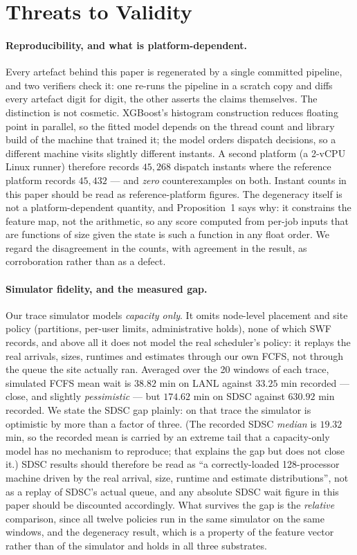 \documentclass[11pt,twocolumn]{article}
\begin{document}
\section{Threats to Validity}
\label{sec:threats}

\paragraph{Reproducibility, and what is platform-dependent.}
Every artefact behind this paper is regenerated by a single committed pipeline,
and two verifiers check it: one re-runs the pipeline in a scratch copy and diffs
every artefact digit for digit, the other asserts the claims themselves. The
distinction is not cosmetic. XGBoost's histogram construction reduces floating
point in parallel, so the fitted model depends on the thread count and library
build of the machine that trained it; the model orders dispatch decisions, so a
different machine visits slightly different instants. A second platform (a
2-vCPU Linux runner) therefore records $45{,}268$ dispatch instants where the
reference platform records $45{,}432$ --- and \emph{zero} counterexamples on
both. Instant counts in this paper should be read as reference-platform figures.
The degeneracy itself is not a platform-dependent quantity, and Proposition~1
says why: it constrains the feature map, not the arithmetic, so any score
computed from per-job inputs that are functions of size given the state is such
a function in any float order. We regard the disagreement in the counts, with
agreement in the result, as corroboration rather than as a defect.

\paragraph{Simulator fidelity, and the measured gap.}
Our trace simulator models \emph{capacity only}. It omits node-level placement
and site policy (partitions, per-user limits, administrative holds), none of
which SWF records, and above all it does not model the real scheduler's policy:
it replays the real arrivals, sizes, runtimes and estimates through our own
FCFS, not through the queue the site actually ran. Averaged over the 20 windows
of each trace, simulated FCFS mean wait is $38.82$ min on LANL against $33.25$
min recorded --- close, and slightly \emph{pessimistic} --- but $174.62$ min on
SDSC against $630.92$ min recorded. We state the SDSC gap plainly: on that trace
the simulator is optimistic by more than a factor of three. (The recorded SDSC
\emph{median} is $19.32$ min, so the recorded mean is carried by an extreme tail
that a capacity-only model has no mechanism to reproduce; that explains the gap
but does not close it.) SDSC results should therefore be read as ``a
correctly-loaded 128-processor machine driven by the real arrival, size, runtime
and estimate distributions'', not as a replay of SDSC's actual queue, and any
absolute SDSC wait figure in this paper should be discounted accordingly. What
survives the gap is the \emph{relative} comparison, since all twelve policies
run in the same simulator on the same windows, and the degeneracy result, which
is a property of the feature vector rather than of the simulator and holds in
all three substrates.
\end{document}
